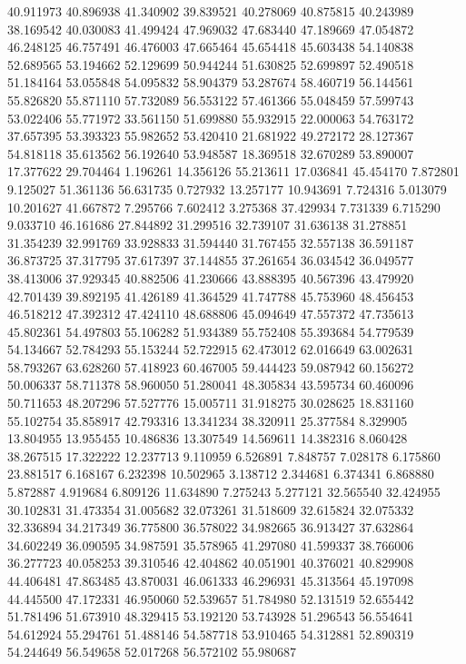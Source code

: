 40.911973
40.896938
41.340902
39.839521
40.278069
40.875815
40.243989
38.169542
40.030083
41.499424
47.969032
47.683440
47.189669
47.054872
46.248125
46.757491
46.476003
47.665464
45.654418
45.603438
54.140838
52.689565
53.194662
52.129699
50.944244
51.630825
52.699897
52.490518
51.184164
53.055848
54.095832
58.904379
53.287674
58.460719
56.144561
55.826820
55.871110
57.732089
56.553122
57.461366
55.048459
57.599743
53.022406
55.771972
33.561150
51.699880
55.932915
22.000063
54.763172
37.657395
53.393323
55.982652
53.420410
21.681922
49.272172
28.127367
54.818118
35.613562
56.192640
53.948587
18.369518
32.670289
53.890007
17.377622
29.704464
1.196261
14.356126
55.213611
17.036841
45.454170
7.872801
9.125027
51.361136
56.631735
0.727932
13.257177
10.943691
7.724316
5.013079
10.201627
41.667872
7.295766
7.602412
3.275368
37.429934
7.731339
6.715290
9.033710
46.161686
27.844892
31.299516
32.739107
31.636138
31.278851
31.354239
32.991769
33.928833
31.594440
31.767455
32.557138
36.591187
36.873725
37.317795
37.617397
37.144855
37.261654
36.034542
36.049577
38.413006
37.929345
40.882506
41.230666
43.888395
40.567396
43.479920
42.701439
39.892195
41.426189
41.364529
41.747788
45.753960
48.456453
46.518212
47.392312
47.424110
48.688806
45.094649
47.557372
47.735613
45.802361
54.497803
55.106282
51.934389
55.752408
55.393684
54.779539
54.134667
52.784293
55.153244
52.722915
62.473012
62.016649
63.002631
58.793267
63.628260
57.418923
60.467005
59.444423
59.087942
60.156272
50.006337
58.711378
58.960050
51.280041
48.305834
43.595734
60.460096
50.711653
48.207296
57.527776
15.005711
31.918275
30.028625
18.831160
55.102754
35.858917
42.793316
13.341234
38.320911
25.377584
8.329905
13.804955
13.955455
10.486836
13.307549
14.569611
14.382316
8.060428
38.267515
17.322222
12.237713
9.110959
6.526891
7.848757
7.028178
6.175860
23.881517
6.168167
6.232398
10.502965
3.138712
2.344681
6.374341
6.868880
5.872887
4.919684
6.809126
11.634890
7.275243
5.277121
32.565540
32.424955
30.102831
31.473354
31.005682
32.073261
31.518609
32.615824
32.075332
32.336894
34.217349
36.775800
36.578022
34.982665
36.913427
37.632864
34.602249
36.090595
34.987591
35.578965
41.297080
41.599337
38.766006
36.277723
40.058253
39.310546
42.404862
40.051901
40.376021
40.829908
44.406481
47.863485
43.870031
46.061333
46.296931
45.313564
45.197098
44.445500
47.172331
46.950060
52.539657
51.784980
52.131519
52.655442
51.781496
51.673910
48.329415
53.192120
53.743928
51.296543
56.554641
54.612924
55.294761
51.488146
54.587718
53.910465
54.312881
52.890319
54.244649
56.549658
52.017268
56.572102
55.980687
